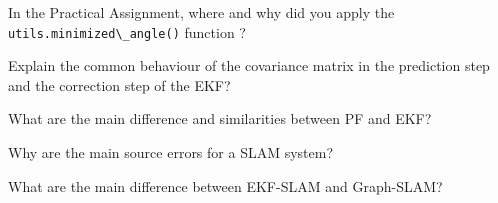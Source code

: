 \documentclass[final]{lcc}
\begin{document}
\maketitle




\ejercicio In the Practical Assignment, where and why did you apply the \lstinline[style=python]{utils.minimized\_angle()} function ?


\ejercicio Explain the common behaviour of the covariance matrix in the prediction step and the correction step of the EKF?

\ejercicio What are the main difference and similarities between PF and EKF?





\ejercicio Why are the main source errors for a SLAM system?

\ejercicio What are the main difference between EKF-SLAM and Graph-SLAM?


\ejercicio 
\end{document}
